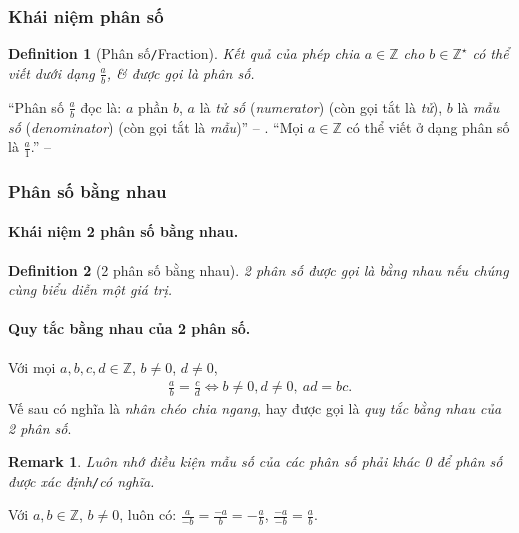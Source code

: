\documentclass{article}
\numberwithin{equation}{section}
\newtheorem{definition}{Definition}[section]
\newtheorem{remark}{Remark}[section]
\begin{document}
\subsubsection{Khái niệm phân số}

\begin{definition}[Phân số\texttt{/}Fraction]
	Kết quả của phép chia $a\in\mathbb{Z}$ cho $b\in\mathbb{Z}^\star$ có thể viết dưới dạng $\frac{a}{b}$, \textit{\&} được gọi là \emph{phân số}.
\end{definition}
``Phân số $\frac{a}{b}$ đọc là: $a$ phần $b$, $a$ là \textit{tử số} (\textit{numerator}) (còn gọi tắt là \textit{tử}), $b$ là \textit{mẫu số} (\textit{denominator}) (còn gọi tắt là \textit{mẫu})'' -- \cite[p.  25]{Thai_Anh_Dat_Ha_Loan_Nam_Quang_Toan_6_tap_2}. ``Mọi $a\in\mathbb{Z}$ có thể viết ở dạng phân số là $\frac{a}{1}$.'' -- \cite[p.  26]{Thai_Anh_Dat_Ha_Loan_Nam_Quang_Toan_6_tap_2}

\subsubsection{Phân số bằng nhau}

\paragraph{Khái niệm 2 phân số bằng nhau.}
\begin{definition}[2 phân số bằng nhau]
	2 phân số được gọi là \emph{bằng nhau} nếu chúng cùng biểu diễn một giá trị.
\end{definition}

\paragraph{Quy tắc bằng nhau của 2 phân số.} Với mọi $a,b,c,d\in\mathbb{Z}$, $b\ne 0$, $d\ne 0$,
\begin{align*}
	\boxed{\frac{a}{b} = \frac{c}{d}\Leftrightarrow b\ne 0, d\ne 0,\ ad = bc.}
\end{align*}
Vế sau có nghĩa là \textit{nhân chéo chia ngang}, hay được gọi là \textit{quy tắc bằng nhau của 2 phân số}.

\begin{remark}
	Luôn nhớ điều kiện mẫu số của các phân số phải khác 0 để phân số được xác định\emph{\texttt{/}}có nghĩa.
\end{remark}
Với $a,b\in\mathbb{Z}$, $b\ne 0$, luôn có: $\frac{a}{-b} = \frac{-a}{b} = -\frac{a}{b}$, $\frac{-a}{-b} = \frac{a}{b}$.
\end{document}
